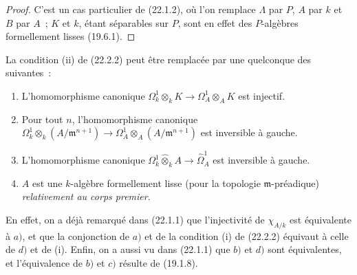 \begin{proof}
C'est un cas particulier de (22.1.2), où l'on remplace $\Lambda$ par $P$,
$A$ par $k$ et $B$ par $A$~; $K$ et $k$, étant séparables sur $P$, sont en
effet des $P$-algèbres formellement lisses (19.6.1).
\end{proof}

\begin{remark}[22.2.3]
\label{0.22.2.3-fr}
La condition (ii) de (22.2.2) peut être remplacée par une quelconque des
suivantes~:
\begin{enumerate}
  \item[\textit{a)}] L'homomorphisme canonique
  $\Omega^1_k\otimes_kK\to\Omega^1_A\otimes_AK$ est injectif.
  \item[\textit{b)}] Pour tout $n$, l'homomorphisme canonique
  $\Omega^1_k\otimes_k(A/\mathfrak m^{n+1})\longrightarrow\Omega^1_A\otimes_A(A/\mathfrak m^{n+1})$
  est inversible à gauche.
  \item[\textit{c)}] L'homomorphisme canonique
  $\Omega^1_k\widehat\otimes_kA\to\widehat\Omega^1_A$ est inversible à
  gauche.
  \item[\textit{d)}] $A$ est une $k$-algèbre formellement lisse (pour la topologie
  $\mathfrak m$-préadique) \emph{relativement au corps premier}.
\end{enumerate}
En effet, on a déjà remarqué dans (22.1.1) que l'injectivité de $\chi_{A/k}$
est équivalente à $a)$, et que la conjonction de $a)$ et de la condition (i)
de (22.2.2) équivaut à celle de $d)$ et de (i). Enfin, on a aussi vu dans
(22.1.1) que $b)$ et $d)$ sont équivalentes, et l'équivalence de $b)$ et
$c)$ résulte de (19.1.8).
\end{remark}
